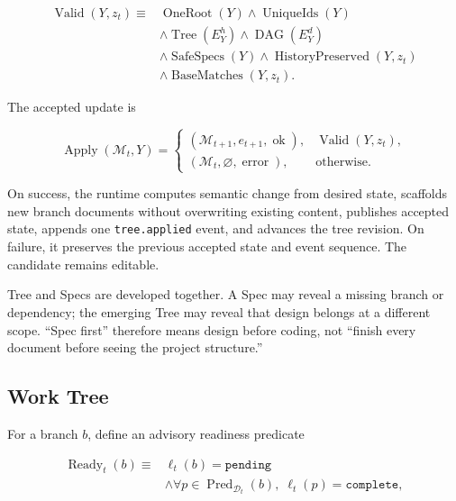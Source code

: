\documentclass[11pt]{article}
\newcommand{\M}{\mathcal{M}}
\newcommand{\D}{\mathcal{D}}
\newcommand{\Apply}{\operatorname{Apply}}
\newcommand{\Valid}{\operatorname{Valid}}
\theoremstyle{definition}
\begin{document}
\begin{equation}
\begin{split}
  \Valid(Y,z_t) \equiv {}&
  \operatorname{OneRoot}(Y)
  \land \operatorname{UniqueIds}(Y)\\
  &\land \operatorname{Tree}(E_Y^h)
  \land \operatorname{DAG}(E_Y^d)\\
  &\land \operatorname{SafeSpecs}(Y)
  \land \operatorname{HistoryPreserved}(Y,z_t)\\
  &\land \operatorname{BaseMatches}(Y,z_t).
\end{split}
\label{eq:tree-validity}
\end{equation}

The accepted update is

\begin{equation}
  \Apply(\M_t,Y)=
  \begin{cases}
    (\M_{t+1},e_{t+1},\operatorname{ok}), & \Valid(Y,z_t),\\
    (\M_t,\varnothing,\operatorname{error}), & \text{otherwise}.
  \end{cases}
  \label{eq:atomic-apply}
\end{equation}

On success, the runtime computes semantic change from desired state, scaffolds
new branch documents without overwriting existing content, publishes accepted
state, appends one \texttt{tree.applied} event, and advances the tree revision.
On failure, it preserves the previous accepted state and event sequence.  The
candidate remains editable.

Tree and Specs are developed together.  A Spec may reveal a missing branch or
dependency; the emerging Tree may reveal that design belongs at a different
scope.  ``Spec first'' therefore means design before coding, not ``finish every
document before seeing the project structure.''

\subsection{Work Tree}

For a branch $b$, define an advisory readiness predicate

\begin{equation}
\begin{split}
  \operatorname{Ready}_t(b)\equiv {}&
  \ell_t(b)=\texttt{pending}\\
  &\land
  \forall p\in\operatorname{Pred}_{\D_t}(b),\;
    \ell_t(p)=\texttt{complete},
\end{split}
\label{eq:readiness}
\end{equation}
\end{document}
